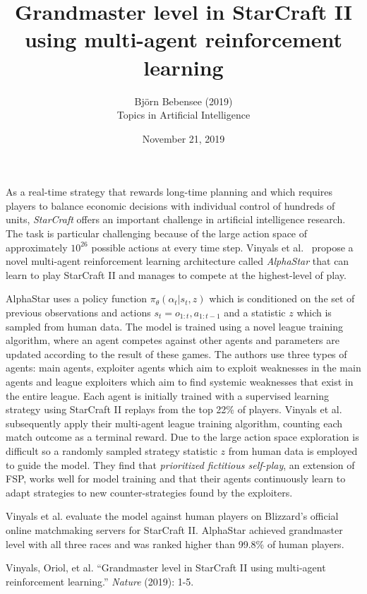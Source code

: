 \documentclass[12pt]{article}
\begin{document}
 
 
\title{Grandmaster level in StarCraft II using multi-agent reinforcement learning}
\author{Bj\"orn Bebensee (2019)\\ %
Topics in Artificial Intelligence}
\date{November 21, 2019}
\maketitle

\noindent
As a real-time strategy that rewards long-time planning and which requires players to balance economic decisions with individual control of hundreds of units, \emph{StarCraft} offers an important challenge in artificial intelligence research. The task is particular challenging because of the large action space of approximately $10^{26}$ possible actions at every time step. Vinyals et al.~\cite{vinyals} propose a novel multi-agent reinforcement learning architecture called \emph{AlphaStar} that can learn to play StarCraft II and manages to compete at the highest-level of play.

AlphaStar uses a policy function $\pi_\theta(\alpha_t|s_t,z)$ which is conditioned on the set of previous observations and actions $s_t = o_{1:t}, a_{1:t-1}$ and a statistic $z$ which is sampled from human data. The model is trained using a novel league training algorithm, where an agent competes against other agents and parameters are updated according to the result of these games. The authors use three types of agents: main agents, exploiter agents which aim to exploit weaknesses in the main agents and league exploiters which aim to find systemic weaknesses that exist in the entire league. Each agent is initially trained with a supervised learning strategy using StarCraft II replays from the top 22\% of players. Vinyals et al. subsequently apply their multi-agent league training algorithm, counting each match outcome as a terminal reward. Due to the large action space exploration is difficult so a randomly sampled strategy statistic $z$ from human data is employed to guide the model. They find that \emph{prioritized fictitious self-play}, an extension of FSP, works well for model training and that their agents continuously learn to adapt strategies to new counter-strategies found by the exploiters. 

Vinyals et al. evaluate the model against human players on Blizzard's official online matchmaking servers for StarCraft II. AlphaStar achieved grandmaster level with all three races and was ranked higher than 99.8\% of human players.


\begin{thebibliography}{9}
Vinyals, Oriol, et al. ``Grandmaster level in StarCraft II using multi-agent reinforcement learning.'' \emph{Nature} (2019): 1-5.

\end{thebibliography}
\end{document}
